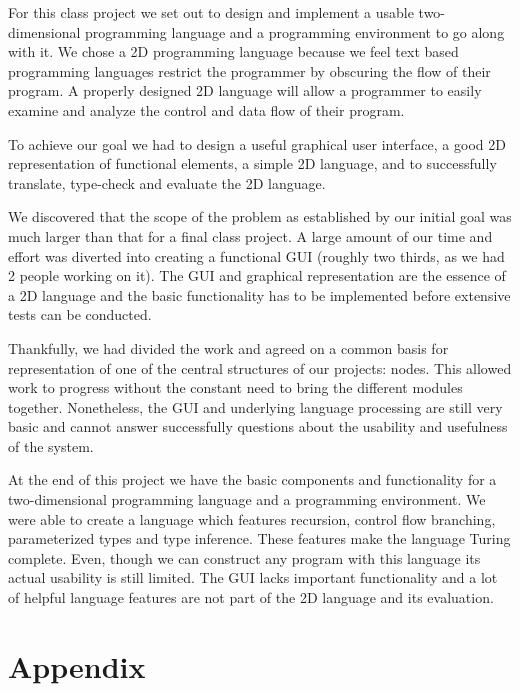 \documentclass[12pt,UTF8,a4]{article}
\begin{document}
For this class project we set out to design and implement a usable two-dimensional programming language and a programming environment to go along with it. We chose a 2D programming language because we feel text based programming languages restrict the programmer by obscuring the flow of their program. A properly designed 2D language will allow a programmer to easily examine and analyze the control and data flow of their program.

To achieve our goal we had to design a useful graphical user interface, a good 2D representation of functional elements, a simple 2D language, and to successfully translate, type-check and evaluate the 2D language.

We discovered that the scope of the problem as established by our initial goal was much larger than that for a final class project. A large amount of our time and effort was diverted into creating a functional GUI (roughly two thirds, as we had 2 people working on it). The GUI and graphical representation are the essence of a 2D language and the basic functionality has to be implemented before extensive tests can be conducted.

Thankfully, we had divided the work and agreed on a common basis for representation of one of the central structures of our projects: nodes. This allowed work to progress without the constant need to bring the different modules together. Nonetheless, the GUI and underlying language processing are still very basic and cannot answer successfully questions about the usability and usefulness of the system.

At the end of this project we have the basic components and functionality for a two-dimensional programming language and a programming environment. We were able to create a language which features recursion, control flow branching, parameterized types and type inference. These features make the language Turing complete. Even, though we can construct any program with this language its actual usability is still limited. The GUI lacks important functionality and a lot of helpful language features are not part of the 2D language and its evaluation.

\newpage
\section{Appendix}
\end{document}
